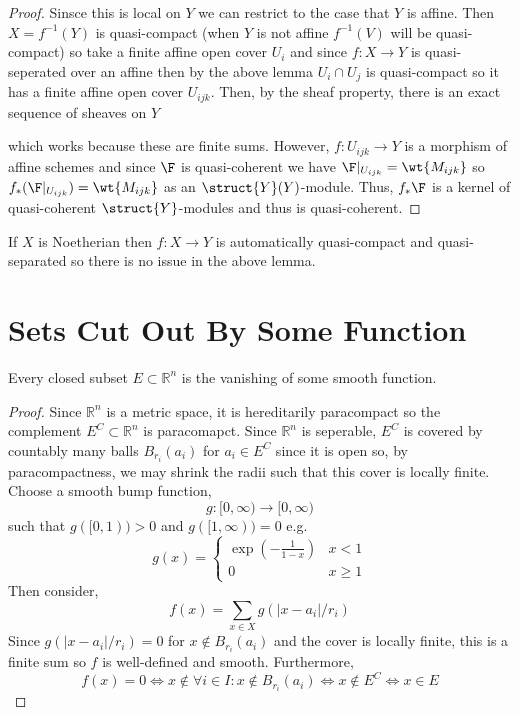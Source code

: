 \documentclass[12pt]{article}
\begin{document}
\begin{proof}
Sinsce this is local on $Y$ we can restrict to the case that $Y$ is affine. Then   $X = f^{-1}(Y)$ is quasi-compact (when $Y$ is not affine $f^{-1}(V)$ will be quasi-compact) so take a finite affine open cover $U_i$ and since $f : X \to Y$ is quasi-seperated over an affine then by the above lemma $U_i \cap U_j$ is quasi-compact so it has a finite affine open cover $U_{ijk}$. Then, by the sheaf property, there is an exact sequence of sheaves on $Y$
\begin{center}
\end{center}
which works because these are finite sums. However, $f : U_{ijk} \to Y$ is a morphism of affine schemes and since $\F$ is quasi-coherent we have $\F |_{U_{ijk}} = \wt{M_{ijk}}$ so $f_* (\F|_{U_{ijk}}) = \wt{M_{ijk}}$ as an $\struct{Y}(Y)$-module. Thus, $f_* \F$ is a kernel of quasi-coherent $\struct{Y}$-modules and thus is quasi-coherent. 
\end{proof}

\begin{rmk}
If $X$ is Noetherian then $f : X \to Y$ is automatically quasi-compact and quasi-separated so there is no issue in the above lemma.
\end{rmk}


\section{Sets Cut Out By Some Function}

\newcommand{\R}{\mathbb{R}}

\begin{theorem}
Every closed subset $E \subset \R^n$ is the vanishing of some smooth function.
\end{theorem}

\begin{proof}
Since $\R^n$ is a metric space, it is hereditarily paracompact so the complement $E^C \subset \R^n$ is paracomapct. Since $\R^n$ is seperable, $E^C$ is covered by countably many balls $B_{r_i}(a_i)$ for $a_i \in E^C$ since it is open so, by paracompactness, we may shrink the radii such that this cover is locally finite. Choose a smooth bump function, 
\[ g : [0, \infty) \to [0, \infty) \]
such that $g([0, 1)) > 0$ and $g([1, \infty)) = 0$ e.g. 
\[ g(x) = 
\begin{cases}
\exp{\left( - \frac{1}{1 - x} \right)} & x < 1
\\
0 & x \ge 1
\end{cases} \]
Then consider,
\[ f(x) = \sum_{x \in X} g(|x - a_i|/r_i) \]
Since $g(|x - a_i|/r_i) = 0$ for $x \notin B_{r_i}(a_i)$ and the cover is locally finite, this is a finite sum so $f$ is well-defined and smooth. Furthermore, 
\[ f(x) = 0 \iff x \notin \forall i \in I : x \notin B_{r_i}(a_i) \iff x \notin E^C \iff x \in E \]
\end{proof}
\end{document}
